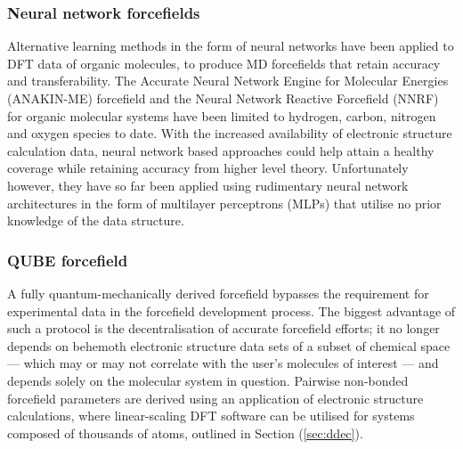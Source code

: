 \subsubsection{Neural network forcefields}
Alternative learning methods in the form of neural networks have been applied to DFT data of organic molecules, to produce MD forcefields that retain accuracy and transferability. The Accurate Neural Network Engine for Molecular Energies (ANAKIN-ME) forcefield and the Neural Network Reactive Forcefield (NNRF) for organic molecular systems have been limited to hydrogen, carbon, nitrogen and oxygen species to date.\cite{smith2017ani,yoo2021neural} With the increased availability of electronic structure calculation data, neural network based approaches could help attain a healthy coverage while retaining accuracy from higher level theory. Unfortunately however, they have so far been applied using rudimentary neural network architectures in the form of multilayer perceptrons (MLPs) that utilise no prior knowledge of the data structure. 

\subsubsection{QUBE forcefield}
A fully quantum-mechanically derived forcefield bypasses the requirement for experimental data in the forcefield development process. The biggest advantage of such a protocol is the decentralisation of accurate forcefield efforts; it no longer depends on behemoth electronic structure data sets of a subset of chemical space --- which may or may not correlate with the user's molecules of interest --- and depends solely on the molecular system in question. Pairwise non-bonded forcefield parameters are derived using an application of electronic structure calculations, where linear-scaling DFT software can be utilised for systems composed of thousands of atoms, outlined in Section (\ref{sec:ddec}). 

